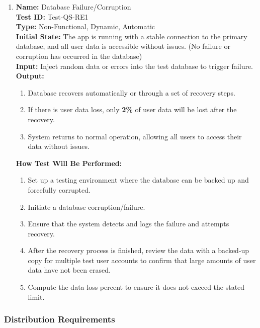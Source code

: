 \documentclass[12pt, titlepage]{article}
\begin{document}
\begin{enumerate}

  \item \textbf{Name:} Database Failure/Corruption \label{itm:Test-QS-RE1} \\
        \textbf{Test ID:} Test-QS-RE1 \\
        \textbf{Type:} Non-Functional, Dynamic, Automatic \\
        \textbf{Initial State:} The app is running with a stable connection to the primary database, and all user data is accessible without issues. (No failure or corruption has occurred in the database) \\
        \textbf{Input:} Inject random data or errors into the test database to trigger failure. \\
        \textbf{Output:}
        \begin{enumerate}
          \item Database recovers automatically or through a set of recovery steps.
          \item If there is user data loss, only \textbf{2\%} of user data will be lost after the recovery.
          \item System returns to normal operation, allowing all users to access their data without issues.
        \end{enumerate}
        \textbf{How Test Will Be Performed:}
        \begin{enumerate}
          \item Set up a testing environment where the database can be backed up and forcefully corrupted.
          \item Initiate a database corruption/failure.
          \item Ensure that the system detects and logs the failure and attempts recovery.
          \item After the recovery process is finished, review the data with a backed-up copy for multiple test user accounts to confirm that large amounts of user data have not been erased.
          \item Compute the data loss percent to ensure it does not exceed the stated limit.
        \end{enumerate}

\end{enumerate}

\subsubsection{Distribution Requirements}
\end{document}
